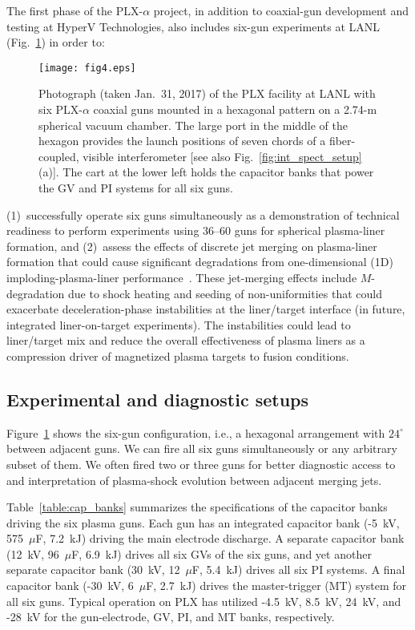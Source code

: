 \documentclass[journal]{IEEEtran}
\begin{document}
The first phase of the PLX-$\alpha$ project, in addition to coaxial-gun development and testing
at HyperV Technologies,
also includes six-gun experiments at LANL (Fig.~\ref{fig:6_guns}) in order to:
\begin{figure}[!b]
\centering
\texttt{[image: fig4.eps]}
\caption{Photograph (taken Jan.~31, 2017) of the PLX facility at LANL
with six PLX-$\alpha$ coaxial guns mounted in a hexagonal pattern
on a 2.74-m spherical vacuum chamber.  The large port in the middle of the hexagon
provides the launch positions of seven chords of a fiber-coupled, visible interferometer 
[see also Fig.~\ref{fig:int_spect_setup}(a)].  The cart at the lower left holds the capacitor
banks that power the GV and PI systems for all six guns.}
\label{fig:6_guns}
\end{figure}
(1)~successfully operate six guns simultaneously as a demonstration of technical readiness to perform
experiments using 36--60 guns for spherical plasma-liner formation, and (2)~assess the effects of
discrete jet merging on plasma-liner formation that could
cause significant degradations from one-dimensional (1D) imploding-plasma-liner
performance~\cite{knapp14,langendorf17pop}.  These jet-merging
effects include $M$-degradation due to shock heating and seeding of non-uniformities
that could exacerbate deceleration-phase instabilities at the liner/target interface (in
future, integrated liner-on-target experiments).  The
instabilities could lead to liner/target mix and reduce the overall effectiveness of plasma liners as a compression driver of magnetized plasma targets to fusion conditions.

\subsection{Experimental and diagnostic setups}
\label{sec:setup}

Figure~\ref{fig:6_guns} shows the six-gun configuration, i.e., a hexagonal arrangement
with $24^\circ$ between adjacent guns.  We can fire all six guns
simultaneously or any arbitrary subset of them.  We often fired two or three guns
for better diagnostic access to and interpretation of plasma-shock evolution between adjacent 
merging jets.

Table~\ref{table:cap_banks} summarizes the specifications of the
capacitor banks driving the six plasma guns.  Each gun
has an integrated capacitor bank (-5~kV, 575~$\mu$F, 7.2~kJ)
driving the main electrode discharge. A separate capacitor 
bank (12~kV, 96~$\mu$F, 6.9~kJ) drives all six GVs of the six guns, and yet another separate capacitor 
bank (30~kV, 12~$\mu$F, 5.4~kJ) drives all six PI systems.  A final capacitor bank (-30~kV, 6~$\mu$F, 
2.7~kJ) drives the master-trigger (MT) system for all six guns.
Typical operation on PLX has utilized -4.5~kV, 8.5~kV, 24~kV, and -28~kV for the
gun-electrode, GV, PI, and MT banks, respectively. 
\end{document}
